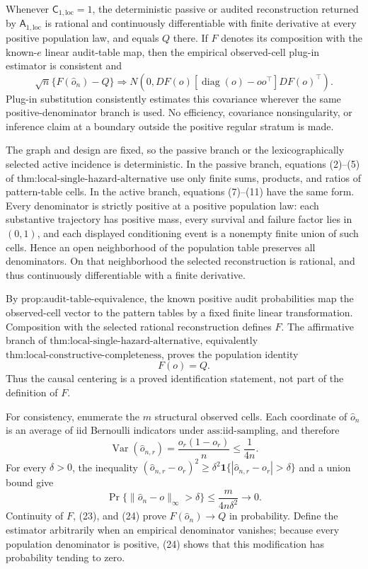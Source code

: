 Whenever \(\mathsf C_{1,\mathrm{loc}}=1\), the deterministic passive or audited reconstruction returned by \(\mathsf A_{1,\mathrm{loc}}\) is rational and continuously differentiable with finite derivative at every positive population law, and equals \(Q\) there.  If \(F\) denotes its composition with the known-\(e\) linear audit-table map, then the empirical observed-cell plug-in estimator is consistent and
\[
\sqrt n\{F(\widehat o_n)-Q\}
\Rightarrow
N\!\left(0,DF(o)[\operatorname{diag}(o)-oo^\top]DF(o)^\top\right).
\]
Plug-in substitution consistently estimates this covariance wherever the same positive-denominator branch is used.  No efficiency, covariance nonsingularity, or inference claim at a boundary outside the positive regular stratum is made.

The graph and design are fixed, so the passive branch or the lexicographically selected active incidence is deterministic.  In the passive branch, equations (2)--(5) of
\(\text{thm:local-single-hazard-alternative}\) use only finite sums, products, and ratios of pattern-table cells.  In the active branch, equations (7)--(11) have the same form.  Every denominator is strictly positive at a positive population law: each substantive trajectory has positive mass, every survival and failure factor lies in \((0,1)\), and each displayed conditioning event is a nonempty finite union of such cells.  Hence an open neighborhood of the population table preserves all denominators.  On that neighborhood the selected reconstruction is rational, and thus continuously differentiable with a finite derivative.

By \(\text{prop:audit-table-equivalence}\), the known positive audit probabilities map the observed-cell vector to the pattern tables by a fixed finite linear transformation.  Composition with the selected rational reconstruction defines \(F\).  The affirmative branch of
\(\text{thm:local-single-hazard-alternative}\), equivalently
\(\text{thm:local-constructive-completeness}\), proves the population identity
\[
F(o)=Q.
\tag{23}
\]
Thus the causal centering is a proved identification statement, not part of the definition of \(F\).

For consistency, enumerate the \(m\) structural observed cells.  Each coordinate of \(\widehat o_n\) is an average of iid Bernoulli indicators under
\(\text{ass:iid-sampling}\), and therefore
\[
\operatorname{Var}(\widehat o_{n,r})
=\frac{o_r(1-o_r)}n\le\frac1{4n}.
\]
For every \(\delta>0\), the inequality
\((\widehat o_{n,r}-o_r)^2\ge
\delta^2\mathbf 1\{|\widehat o_{n,r}-o_r|>\delta\}\) and a union bound give
\[
\Pr\{\|\widehat o_n-o\|_\infty>\delta\}
\le\frac{m}{4n\delta^2}\longrightarrow0.
\tag{24}
\]
Continuity of \(F\), (23), and (24) prove
\(F(\widehat o_n)\to Q\) in probability.  Define the estimator arbitrarily when an empirical denominator vanishes; because every population denominator is positive, (24) shows that this modification has probability tending to zero.

